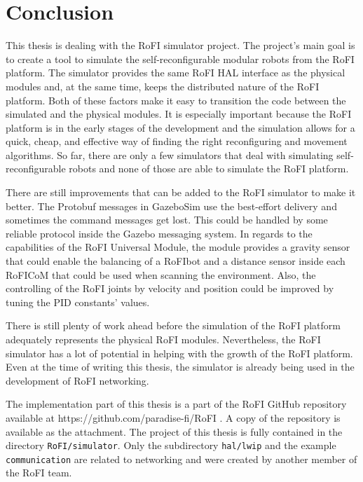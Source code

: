 \documentclass[
  printed, %
  color,   %
  notable, %
  oneside, %
  nolof,   %
  nolot,   %
  nocover,
]{fithesis3}
\newcommand{\code}[1]{\texttt{#1}}
\begin{document}
\chapter{Conclusion}

This thesis is dealing with the RoFI simulator project.
The project's main goal is to create a tool to simulate the self-reconfigurable modular robots from the RoFI platform.
The simulator provides the same RoFI HAL interface as the physical modules and, at the same time, keeps the distributed nature of the RoFI platform.
Both of these factors make it easy to transition the code between the simulated and the physical modules.
It is especially important because the RoFI platform is in the early stages of the development and the simulation allows for a quick, cheap, and effective way of finding the right reconfiguring and movement algorithms.
So far, there are only a few simulators that deal with simulating self-reconfigurable robots and none of those are able to simulate the RoFI platform.

There are still improvements that can be added to the RoFI simulator to make it better.
The Protobuf messages in GazeboSim use the best-effort delivery and sometimes the command messages get lost.
This could be handled by some reliable protocol inside the Gazebo messaging system.
In regards to the capabilities of the RoFI Universal Module, the module provides a gravity sensor that could enable the balancing of a RoFIbot and a distance sensor inside each RoFICoM that could be used when scanning the environment.
Also, the controlling of the RoFI joints by velocity and position could be improved by tuning the PID constants' values.

There is still plenty of work ahead before the simulation of the RoFI platform adequately represents the physical RoFI modules.
Nevertheless, the RoFI simulator has a lot of potential in helping with the growth of the RoFI platform.
Even at the time of writing this thesis, the simulator is already being used in the development of RoFI networking.

The implementation part of this thesis is a part of the RoFI GitHub repository available at https://github.com/paradise-fi/RoFI .
A copy of the repository is available as the attachment.
The project of this thesis is fully contained in the directory \code{RoFI/simulator}.
Only the subdirectory \code{hal/lwip} and the example \code{communication} are related to networking and were created by another member of the RoFI team.
\end{document}
